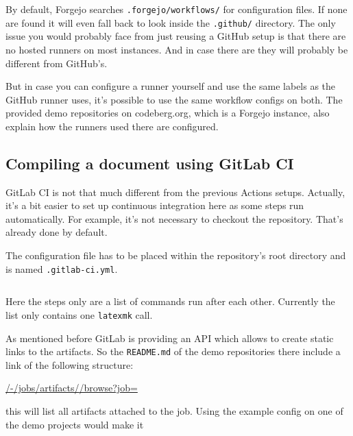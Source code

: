 \documentclass[final]{ltugboat}
\newcommand*{\setListingIcon}[1]{\def\listingIcon{#1}}
\newcommand*{\command}[1]{\texttt{#1}}
\newcommand*{\file}[1]{\texttt{#1}}
\newcommand*{\directory}[1]{\texttt{#1}}
\begin{document}
By default, Forgejo searches \directory{.forgejo/workflows/} for configuration files.
If none are found it will even fall back to look inside the \directory{.github/} directory.
The only issue you would probably face from just reusing a GitHub setup is that there are no hosted runners on most instances.
And in case there are they will probably be different from GitHub's.

But in case you can configure a runner yourself and use the same labels as the GitHub runner \cite[described in]{forgejo-runner-config} uses, it's possible to use the same workflow configs on both.
The provided demo repositories on codeberg.org, which is a Forgejo instance, also explain how the runners used there are configured.

\subsection{Compiling a document using GitLab CI}
\setListingIcon{\GitLab}

GitLab CI is not that much different from the previous Actions setups.
Actually, it's a bit easier to set up continuous integration here as some steps run automatically.
For example, it's not necessary to checkout the repository.
That's already done by default.

The configuration file has to be placed within the repository's root directory and is named \file{.gitlab-ci.yml}.

\inputminted[breaklines,breakafter=/]{yaml}{examples/latex-basic-gitlab.yml}

Here the steps only are a list of commands run after each other. Currently the list only contains one \command{latexmk} call.

As mentioned before GitLab is providing an API which allows to create static links to the artifacts.
So the \file{README.md} of the demo repositories there include a link of the following structure:

\begin{FlushLeft}
\url{/-/jobs/artifacts/}\allowbreak\url{/browse?job=}
\end{FlushLeft}

this will list all artifacts attached to the job.
Using the example config on one of the demo projects would make it
\end{document}
